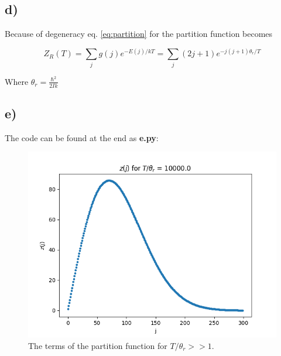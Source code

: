 \documentclass[a4paper,norsk, 10pt]{article}
\begin{document}
\subsection{d)}

Because of degeneracy eq. \eqref{eq:partition} for the partition function becomes

\begin{equation}
Z_R(T) = \sum_j g(j)e^{-E(j)/kT} = \sum_j (2j + 1) e^{-j(j+1)\theta_r/T}
\end{equation}\label{eq:partitionD}

Where $\theta_r = \frac{\hbar^2}{2Ik}$

\subsection{e)}

The code can be found at the end as \textbf{e.py}:

\begin{figure}[H]
\centering
\includegraphics[scale=0.5]{e_stor.png}
\caption{The terms of the partition function for $T/\theta_r >> 1$.}
\end{figure}\label{fig:large}
\end{document}
